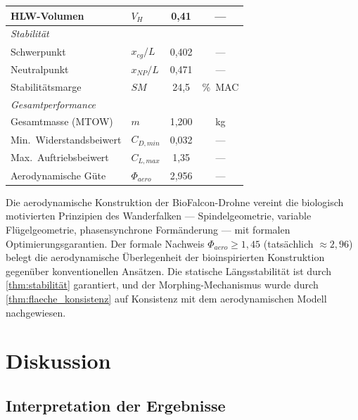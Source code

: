 ﻿\documentclass[12pt,a4paper]{article}
\theoremstyle{remark}
\begin{document}
\begin{table}[H]
\begin{tabular}{llcc}
			HLW-Volumen              & $V_H$         & 0{,}41    & ---                   \\
			\midrule
			\multicolumn{4}{l}{\textit{Stabilität}} \\
			Schwerpunkt              & $x_{cg}/L$    & 0{,}402   & ---                   \\
			Neutralpunkt             & $x_{NP}/L$    & 0{,}471   & ---                   \\
			Stabilitätsmarge         & $SM$          & 24{,}5    & \si{\percent MAC}     \\
			\midrule
			\multicolumn{4}{l}{\textit{Gesamtperformance}} \\
			Gesamtmasse (MTOW)       & $m$           & 1{,}200   & \si{\kg}              \\
			Min.\ Widerstandsbeiwert & $C_{D,min}$   & 0{,}032   & ---                   \\
			Max.\ Auftriebsbeiwert   & $C_{L,max}$   & 1{,}35    & ---                   \\
			Aerodynamische Güte      & $\Phi_{aero}$ & 2{,}956   & ---                   \\
			\bottomrule
		\end{tabular}
	\end{table}
	
	Die aerodynamische Konstruktion der BioFalcon-Drohne vereint die biologisch
	motivierten Prinzipien des Wanderfalken --- Spindelgeometrie, variable Flügelgeometrie,
	phasensynchrone Formänderung --- mit formalen Optimierungsgarantien.  Der formale
	Nachweis $\Phi_{aero} \geq 1{,}45$ (tatsächlich $\approx 2{,}96$) belegt die
	aerodynamische Überlegenheit der bioinspirierten Konstruktion gegenüber konventionellen
	Ansätzen.  Die statische Längsstabilität ist durch \cref{thm:stabilität} garantiert,
	und der Morphing-Mechanismus wurde durch \cref{thm:flaeche_konsistenz} auf Konsistenz
	mit dem aerodynamischen Modell nachgewiesen.
	
	\section{Diskussion}
	
	\subsection{Interpretation der Ergebnisse}
	
\end{document}
